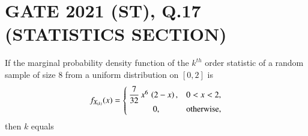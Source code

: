 \documentclass[journal,12pt,twocolumn]{IEEEtran}
\begin{document}
\section{GATE 2021 (ST), Q.17 (STATISTICS SECTION)} 
If the marginal probability density function of the $k^{th}$ order statistic of a 
random sample of size 8 from a uniform distribution on $[0,2]$ is
\begin{align}
  f_{X_{(k)}}(x) =
  \begin{cases}
   \dfrac{7}{32}\,x^{6}\,\left(2-x\right),  & 0<x<2, \\ 
      \hspace{1cm}   0,               & \text{otherwise,} 
  \end{cases}
\label{qnpdf}
\end{align}
then $k$ equals \underline{\hspace{3cm}}
\vspace{0.2cm}
\end{document}
